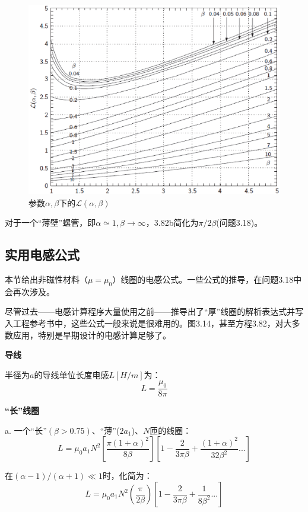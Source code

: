 \begin{figure}[htbp]
  \centering
 \includegraphics[scale=0.5]{chpt3/figs/fig3.14.eps}
  \caption{参数$\alpha,\beta$下的$\mathcal{L}(\alpha,\beta)$}
\end{figure}

对于一个“薄壁”螺管，即$\alpha\simeq 1,\beta\rightarrow \infty$，3.82b简化为$\pi/2\beta$(问题3.18)。

\subsection{实用电感公式}
本节给出非磁性材料（$\mu=\mu_0$）线圈的电感公式。一些公式的推导，在问题3.18中会再次涉及。

尽管过去——电感计算程序大量使用之前——推导出了“厚”线圈的解析表达式并写入工程参考书中，这些公式一般来说是很难用的。图3.14，甚至方程3.82，对大多数应用，特别是早期设计的电感计算足够了。


\textbf{导线}  
  
  半径为$a$的导线单位长度电感$L[H/m]$为：
  \begin{equation}
         L=\frac{\mu_0}{8\pi}%
  \end{equation}
  
\textbf{“长”线圈} 
  
  a. 一个“长”$(β>0.75)$、“薄”($2a_1$)、$N$匝的线圈：
  \begin{equation}
  L=\mu_0a_1N^2[\frac{\pi(1+\alpha)^2}{8\beta}][1-\frac{2}{3\pi\beta}+\frac{(1+\alpha)^2}{32\beta^2}...]%
\end{equation}

在$(\alpha−1)/(\alpha+1)\ll 1$时，化简为：
\begin{equation}
  L=\mu_0a_1N^2(\frac{\pi}{2\beta})[1-\frac{2}{3\pi\beta}+\frac{1}{8\beta^2}...]%
\end{equation}

